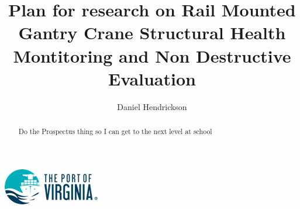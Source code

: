 \documentclass[journal=jacsat,manuscript=article]{achemso}
\author{Daniel Hendrickson}
\affiliation[Port of Virginia]
{Vice President Asset Management, Virginia Port Authority, Norfolk, VA}
\title[Research Prospecutus]
  {Plan for research on Rail Mounted Gantry Crane Structural Health Montitoring and Non Destructive Evaluation}
\begin{document}
\begin{tocentry}

\includegraphics{Figures/PortLogo}

\end{tocentry}

\begin{abstract}
 
Do the Prospectus thing so I can get to the next level at school
  

\end{abstract}
\pagebreak



\pagebreak
\end{document}
